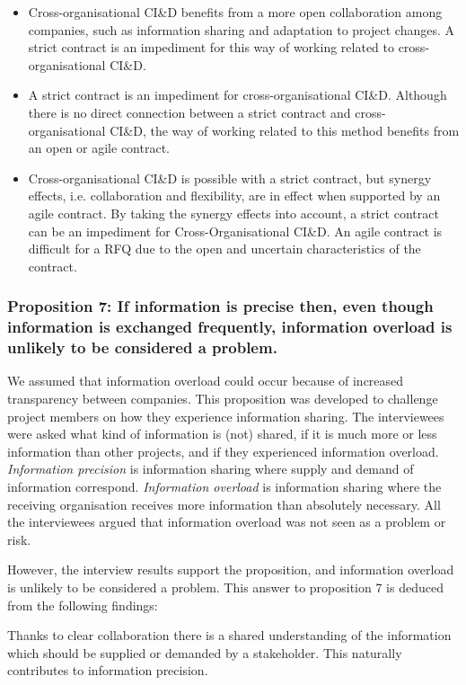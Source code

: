 \begin{itemize}
\item Cross-organisational CI\&D benefits from a more open collaboration among companies, such as information sharing and adaptation to project changes. A strict contract is an impediment for this way of working related to cross-organisational CI\&D.
\item A strict contract is an impediment for cross-organisational CI\&D. Although there is no direct connection between a strict contract and cross-organisational CI\&D, the way of working related to this method benefits from an open or agile contract.
\item Cross-organisational CI\&D is possible with a strict contract, but synergy effects, i.e. collaboration and flexibility, are in effect when supported by an agile contract. By taking the synergy effects into account, a strict contract can be an impediment for Cross-Organisational CI\&D. An agile contract is difficult for a RFQ due to the open and uncertain characteristics of the contract.
\end{itemize}

\subsubsection{Proposition 7: If information is precise then, even though information is exchanged frequently, information overload is unlikely to be considered a problem.}

We assumed that information overload could occur because of increased transparency between companies. This proposition was developed to challenge project members on how they experience information sharing. The interviewees were asked what kind of information is (not) shared, if it is much more or less information than other projects, and if they experienced information overload. {\em Information precision} is information sharing where supply and demand of information correspond. {\em Information overload} is information sharing where the receiving organisation receives more information than absolutely necessary. All the interviewees argued that information overload was not seen as a problem or risk.

However, the interview results support the proposition, and information overload is unlikely to be considered a problem. This answer to proposition 7 is deduced from the following findings:

 Thanks to clear collaboration there is a shared understanding of the information which should be supplied or demanded by a stakeholder. This naturally contributes to information precision.



